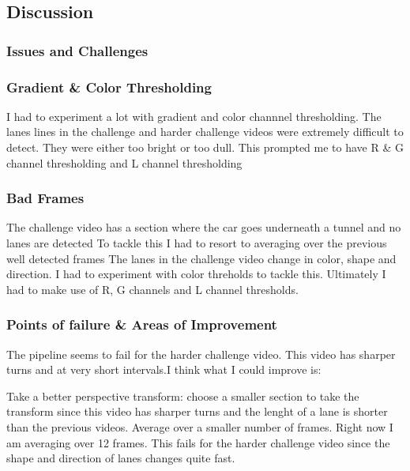 \documentclass[11pt]{article}
\begin{document}
    \hypertarget{discussion}{%
\subsection{Discussion}\label{discussion}}

\hypertarget{issues-and-challenges}{%
\subsubsection{Issues and Challenges}\label{issues-and-challenges}}

\hypertarget{gradient-color-thresholding}{%
\subsubsection{Gradient \& Color
Thresholding}\label{gradient-color-thresholding}}

I had to experiment a lot with gradient and color channnel thresholding.
The lanes lines in the challenge and harder challenge videos were
extremely difficult to detect. They were either too bright or too dull.
This prompted me to have R \& G channel thresholding and L channel
thresholding

\hypertarget{bad-frames}{%
\subsubsection{Bad Frames}\label{bad-frames}}

The challenge video has a section where the car goes underneath a tunnel
and no lanes are detected To tackle this I had to resort to averaging
over the previous well detected frames The lanes in the challenge video
change in color, shape and direction. I had to experiment with color
threholds to tackle this. Ultimately I had to make use of R, G channels
and L channel thresholds.

\hypertarget{points-of-failure-areas-of-improvement}{%
\subsubsection{Points of failure \& Areas of
Improvement}\label{points-of-failure-areas-of-improvement}}

The pipeline seems to fail for the harder challenge video. This video
has sharper turns and at very short intervals.I think what I could
improve is:

Take a better perspective transform: choose a smaller section to take
the transform since this video has sharper turns and the lenght of a
lane is shorter than the previous videos. Average over a smaller number
of frames. Right now I am averaging over 12 frames. This fails for the
harder challenge video since the shape and direction of lanes changes
quite fast.


    
    
    
    
\end{document}
